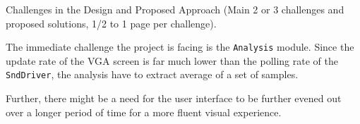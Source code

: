 Challenges in the Design and Proposed Approach (Main 2 or 3 challenges and proposed solutions, 1/2 to 1 page per challenge).

The immediate challenge the project is facing is the \texttt{Analysis} module. Since the update rate of the VGA screen is far much lower than the polling rate of the \texttt{SndDriver}, the analysis have to extract average of a set of samples. 


Further, there might be a need for the user interface to be further evened out over a longer period of time for a more fluent visual experience.
